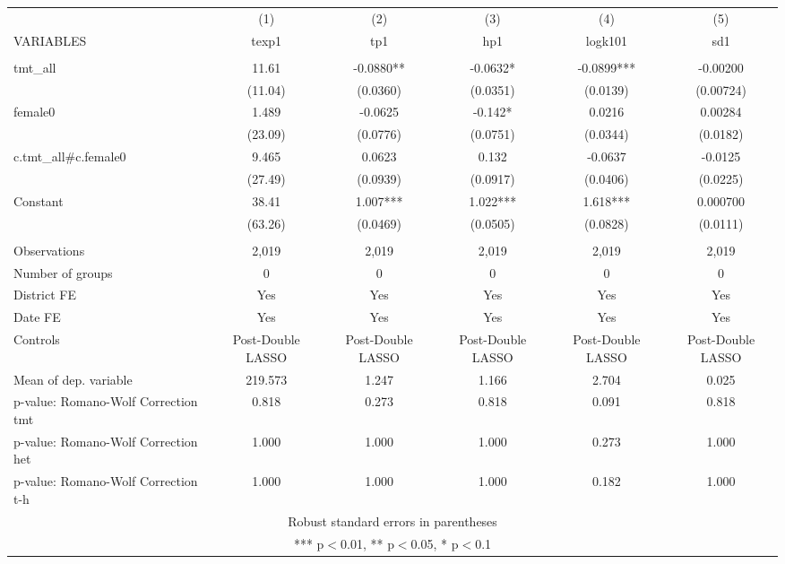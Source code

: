 \documentclass[]{article}
\begin{document}
\begin{tabular}{lccccc} \hline
 & (1) & (2) & (3) & (4) & (5) \\
VARIABLES & texp1 & tp1 & hp1 & logk101 & sd1 \\ \hline
 &  &  &  &  &  \\
tmt\_all & 11.61 & -0.0880** & -0.0632* & -0.0899*** & -0.00200 \\
 & (11.04) & (0.0360) & (0.0351) & (0.0139) & (0.00724) \\
female0 & 1.489 & -0.0625 & -0.142* & 0.0216 & 0.00284 \\
 & (23.09) & (0.0776) & (0.0751) & (0.0344) & (0.0182) \\
c.tmt\_all\#c.female0 & 9.465 & 0.0623 & 0.132 & -0.0637 & -0.0125 \\
 & (27.49) & (0.0939) & (0.0917) & (0.0406) & (0.0225) \\
Constant & 38.41 & 1.007*** & 1.022*** & 1.618*** & 0.000700 \\
 & (63.26) & (0.0469) & (0.0505) & (0.0828) & (0.0111) \\
 &  &  &  &  &  \\
Observations & 2,019 & 2,019 & 2,019 & 2,019 & 2,019 \\
Number of groups & 0 & 0 & 0 & 0 & 0 \\
District FE & Yes & Yes & Yes & Yes & Yes \\
Date FE & Yes & Yes & Yes & Yes & Yes \\
Controls & Post-Double LASSO & Post-Double LASSO & Post-Double LASSO & Post-Double LASSO & Post-Double LASSO \\
Mean of dep. variable & 219.573 & 1.247 & 1.166 & 2.704 & 0.025 \\
p-value: Romano-Wolf Correction tmt & 0.818 & 0.273 & 0.818 & 0.091 & 0.818 \\
p-value: Romano-Wolf Correction het & 1.000 & 1.000 & 1.000 & 0.273 & 1.000 \\
 p-value: Romano-Wolf Correction t-h & 1.000 & 1.000 & 1.000 & 0.182 & 1.000 \\ \hline
\multicolumn{6}{c}{ Robust standard errors in parentheses} \\
\multicolumn{6}{c}{ *** p$<$0.01, ** p$<$0.05, * p$<$0.1} \\
\end{tabular}
\end{document}
